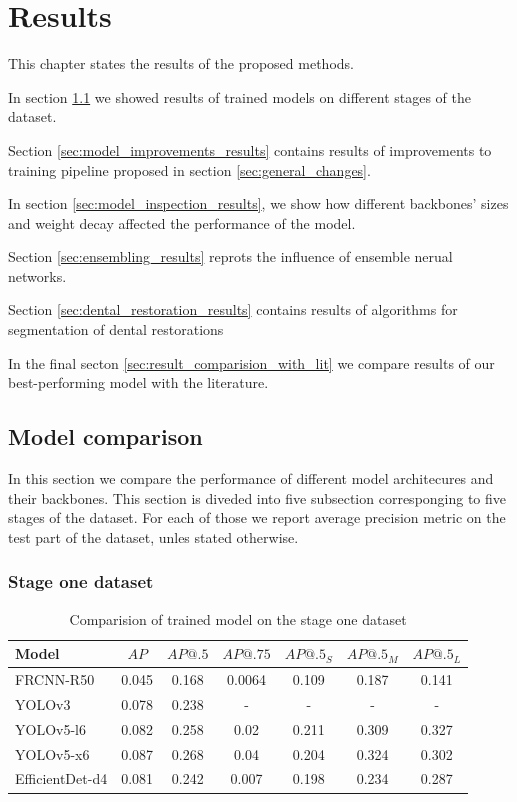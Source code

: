 \chapter{Results}
\label{chapter:results}
This chapter states the results of the proposed methods.

In section \ref{sec:model_comparison} we showed results of trained models on different stages of the dataset.

Section \ref{sec:model_improvements_results} contains results of improvements to training pipeline proposed in section \ref{sec:general_changes}.

In section \ref{sec:model_inspection_results}, we show how different backbones' sizes and weight decay affected the performance of the model.

Section \ref{sec:ensembling_results} reprots the influence of ensemble nerual networks.

Section \ref{sec:dental_restoration_results} contains results of algorithms for segmentation of dental restorations

In the final secton \ref{sec:result_comparision_with_lit} we compare results of our best-performing model with the literature.

\section{Model comparison}
\label{sec:model_comparison}
In this section we compare the performance of different model architecures and their backbones. This section is diveded into five subsection corresponging to five stages of the dataset. For each of those we report average precision metric on the test part of the dataset, unles stated otherwise.
\subsection{Stage one dataset}
\begin{table}[H]
    \centering
    \begin{tabular}{|l|c|c|c|c|c|c|}
        \hline
        Model           & $AP$  & $AP@.5$ & $AP@.75$ & $AP@.5_S$ & $AP@.5_M$ & $AP@.5_L$ \\ \hline
        FRCNN-R50       & 0.045 & 0.168   & 0.0064   & 0.109     & 0.187     & 0.141     \\ \hline
        YOLOv3          & 0.078 & 0.238   & -        & -         & -         & -         \\ \hline
        YOLOv5-l6       & 0.082 & 0.258   & 0.02     & 0.211     & 0.309     & 0.327     \\ \hline
        YOLOv5-x6       & 0.087 & 0.268   & 0.04     & 0.204     & 0.324     & 0.302     \\ \hline
        EfficientDet-d4 & 0.081 & 0.242   & 0.007    & 0.198     & 0.234     & 0.287     \\ \hline
    \end{tabular}
    \caption{Comparision of trained model on the stage one dataset}
    \label{tab:model_results:stage_one}
\end{table}


